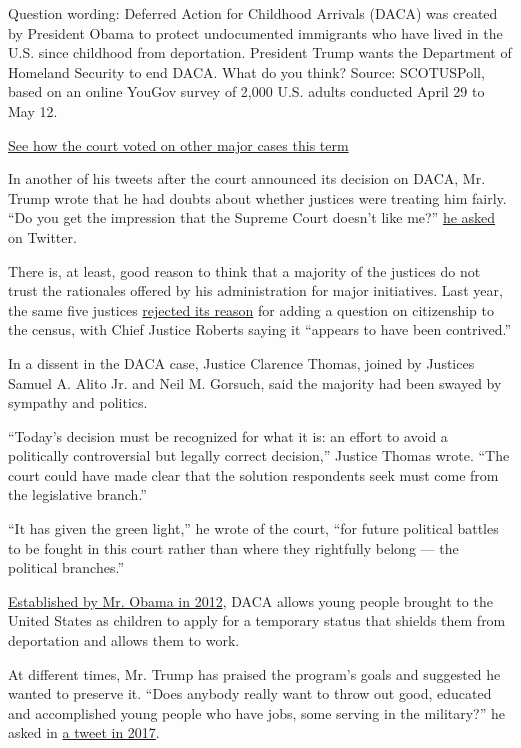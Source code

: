 Question wording: Deferred Action for Childhood Arrivals (DACA) was
created by President Obama to protect undocumented immigrants who have
lived in the U.S. since childhood from deportation. President Trump
wants the Department of Homeland Security to end DACA. What do you
think? \textbar{} Source: SCOTUSPoll, based on an online YouGov survey
of 2,000 U.S. adults conducted April 29 to May 12.

\href{https://www.nytimes3xbfgragh.onion/interactive/2020/06/15/us/supreme-court-major-cases-2020.html}{See
how the court voted on other major cases this term}

In another of his tweets after the court announced its decision on DACA,
Mr. Trump wrote that he had doubts about whether justices were treating
him fairly. ``Do you get the impression that the Supreme Court doesn't
like me?'' \href{https://twitter.com/realDonaldTrump}{he asked} on
Twitter.

There is, at least, good reason to think that a majority of the justices
do not trust the rationales offered by his administration for major
initiatives. Last year, the same five justices
\href{https://www.nytimes3xbfgragh.onion/2019/06/27/us/politics/census-citizenship-question-supreme-court.html}{rejected
its reason} for adding a question on citizenship to the census, with
Chief Justice Roberts saying it ``appears to have been contrived.''

In a dissent in the DACA case, Justice Clarence Thomas, joined by
Justices Samuel A. Alito Jr. and Neil M. Gorsuch, said the majority had
been swayed by sympathy and politics.

``Today's decision must be recognized for what it is: an effort to avoid
a politically controversial but legally correct decision,'' Justice
Thomas wrote. ``The court could have made clear that the solution
respondents seek must come from the legislative branch.''

``It has given the green light,'' he wrote of the court, ``for future
political battles to be fought in this court rather than where they
rightfully belong --- the political branches.''

\href{https://www.dhs.gov/news/2012/06/15/secretary-napolitano-announces-deferred-action-process-young-people-who-are-low}{Established
by Mr. Obama in 2012}, DACA allows young people brought to the United
States as children to apply for a temporary status that shields them
from deportation and allows them to work.

At different times, Mr. Trump has praised the program's goals and
suggested he wanted to preserve it. ``Does anybody really want to throw
out good, educated and accomplished young people who have jobs, some
serving in the military?'' he asked in
\href{https://twitter.com/realdonaldtrump/status/908276308265795585?lang=en}{a
tweet in 2017}.

